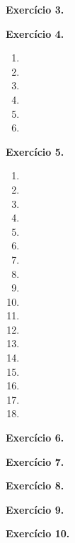 \documentclass[12pt,a4paper]{article}
\begin{document}
\vspace{0.5cm}
\noindent\textbf{Exercício 3.}

\vspace{0.5cm}
\noindent\textbf{Exercício 4.}
\begin{enumerate}
    \renewcommand{\theenumi}{\alph{enumi}}
    \renewcommand{\labelenumi}{\theenumi)}
    \item 
    \item 
    \item 
    \item 
    \item 
    \item 
\end{enumerate}

\vspace{0.5cm}
\noindent\textbf{Exercício 5.}
\begin{enumerate}
    \renewcommand{\theenumi}{\alph{enumi}}
    \renewcommand{\labelenumi}{\theenumi)}
    \item 
    \item 
    \item 
    \item 
    \item 
    \item 
    \item 
    \item 
    \item 
    \item 
    \item 
    \item 
    \item 
    \item 
    \item 
    \item 
    \item 
    \item 
\end{enumerate}

\vspace{0.5cm}
\noindent\textbf{Exercício 6.}

\vspace{0.5cm}
\noindent\textbf{Exercício 7.}

\vspace{0.5cm}
\noindent\textbf{Exercício 8.}

\vspace{0.5cm}
\noindent\textbf{Exercício 9.}

\vspace{0.5cm}
\noindent\textbf{Exercício 10.}
\end{document}
